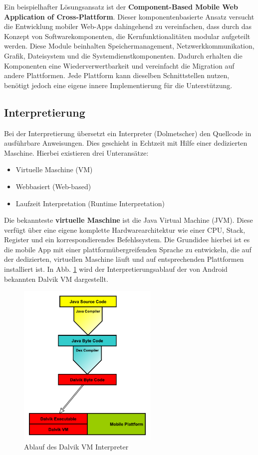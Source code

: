 \medskip
Ein beispielhafter Lösungsansatz ist der \textbf{Component-Based Mobile Web Application of Cross-Plattform}. Dieser komponentenbasierte Ansatz versucht die Entwicklung mobiler Web-Apps dahingehend zu vereinfachen, dass durch das Konzept von Softwarekomponenten, die Kernfunktionalitäten modular aufgeteilt werden. Diese Module beinhalten Speichermanagement, Netzwerkkommunikation, Grafik, Dateisystem und die Systemdienstkomponenten. Dadurch erhalten die Komponenten eine Wiederverwertbarkeit und vereinfacht die Migration auf andere Plattformen. Jede Plattform kann dieselben Schnittstellen nutzen, benötigt jedoch eine eigene innere Implementierung für die Unterstützung. 

\subsection{Interpretierung}
Bei der Interpretierung übersetzt ein Interpreter (Dolmetscher) den Quellcode in ausführbare Anweisungen. Dies geschieht in Echtzeit mit Hilfe einer dedizierten Maschine. Hierbei existieren drei Unteransätze:

\begin{itemize}
	\item Virtuelle Maschine (VM)
	\item Webbasiert (Web-based)
	\item Laufzeit Interpretation (Runtime Interpretation)
\end{itemize}

Die bekannteste \textbf{virtuelle Maschine} ist die Java Virtual Machine (JVM). Diese verfügt über eine eigene komplette Hardwarearchitektur wie einer CPU, Stack, Register und ein korrespondierendes Befehlssystem. Die Grundidee hierbei ist es die mobile App mit einer plattformübergreifenden Sprache zu entwickeln, die auf der dedizierten, virtuellen Maschine läuft und auf entsprechenden Plattformen installiert ist. In Abb. \ref{graph_interpreter_Dalvik} wird der Interpretierungsablauf der von Android bekannten Dalvik VM dargestellt.

\begin{figure}[htbp]
	\centering
	\includegraphics[width=0.6\textwidth]{Bilder/Interpretation_VM_Dalvik}
	\caption{Ablauf des Dalvik VM Interpreter}\label{graph_interpreter_Dalvik}
\end{figure}

